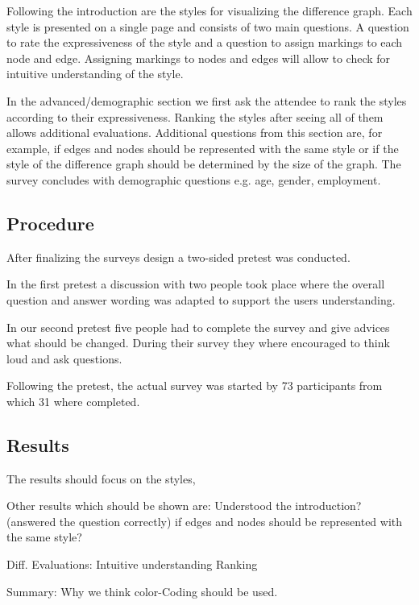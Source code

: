 \documentclass{llncs}
\begin{document}
Following the introduction are the styles for visualizing the difference graph. Each style is presented on a single page and consists of two main questions. A question to rate the expressiveness of the style and a question to assign markings to each node and edge. Assigning markings to nodes and edges will allow to check for intuitive understanding of the style.

In the advanced/demographic section we first ask the attendee to rank the styles according to their expressiveness. Ranking the styles after seeing all of them allows additional evaluations. Additional questions from this section are, for example, if edges and nodes should be represented with the same style or if the style of the difference graph should be determined by the size of the graph. The survey concludes with demographic questions e.g. age, gender, employment.


\subsection{Procedure} %
\label{sec:Procedure}
After finalizing the surveys design a two-sided pretest was conducted.

In the first pretest a discussion with two people took place where the overall question and answer wording was adapted to support the users understanding.

In our second pretest five people had to complete the survey and give advices what should be changed. During their survey they where encouraged to think loud and ask questions.  



Following the pretest, the actual survey was started by 73 participants from which 31 where completed.

\subsection{Results} %
\label{sec:Results}

The results should focus on the styles,

Other results which should be shown are:
Understood the introduction? (answered the question correctly)
if edges and nodes should be represented with the same style?


Diff. Evaluations:
Intuitive understanding
Ranking



Summary:
Why we think color-Coding should be used.
\end{document}
